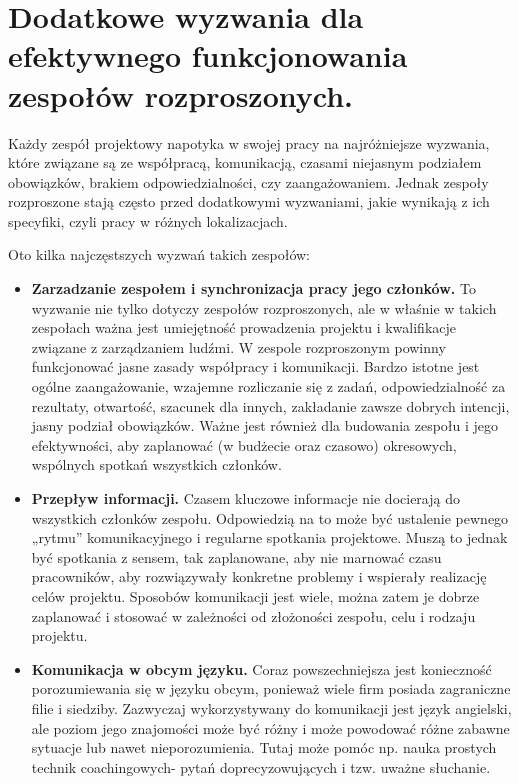 \section{Dodatkowe wyzwania dla efektywnego funkcjonowania zespołów rozproszonych.}

Każdy zespół projektowy napotyka w swojej pracy na najróżniejsze wyzwania, które związane są ze współpracą, komunikacją, czasami niejasnym podziałem obowiązków, brakiem odpowiedzialności, czy zaangażowaniem. Jednak zespoły rozproszone stają często przed dodatkowymi wyzwaniami, jakie wynikają z ich specyfiki, czyli pracy w różnych lokalizacjach.

Oto kilka najczęstszych wyzwań takich zespołów:

\begin{itemize}
	\item \textbf{Zarzadzanie zespołem i synchronizacja pracy jego członków.}
	To wyzwanie nie tylko dotyczy zespołów rozproszonych, ale w właśnie w takich zespołach ważna jest umiejętność prowadzenia projektu i kwalifikacje związane z zarządzaniem ludźmi. W zespole rozproszonym powinny funkcjonować jasne zasady współpracy i komunikacji. Bardzo istotne jest ogólne zaangażowanie, wzajemne rozliczanie się z zadań, odpowiedzialność za rezultaty, otwartość, szacunek dla innych, zakładanie zawsze dobrych intencji, jasny podział obowiązków. Ważne jest również dla budowania zespołu i jego efektywności, aby zaplanować (w budżecie oraz czasowo) okresowych, wspólnych spotkań wszystkich członków.
	\item \textbf{Przepływ informacji.}
	Czasem kluczowe informacje nie docierają do wszystkich członków zespołu. Odpowiedzią na to może być ustalenie pewnego „rytmu” komunikacyjnego i regularne spotkania projektowe. Muszą to jednak być spotkania z sensem, tak zaplanowane, aby nie marnować czasu pracowników, aby rozwiązywały konkretne problemy i wspierały realizację celów projektu. Sposobów komunikacji jest wiele, można zatem je dobrze zaplanować i stosować w zależności od złożoności zespołu, celu i rodzaju projektu.
	\item \textbf{Komunikacja w obcym języku.}
	Coraz powszechniejsza jest konieczność porozumiewania się w języku obcym, ponieważ wiele firm posiada zagraniczne filie i siedziby. Zazwyczaj wykorzystywany do komunikacji jest język angielski, ale poziom jego znajomości może być różny i może powodować różne zabawne sytuacje lub nawet nieporozumienia. Tutaj może pomóc np. nauka prostych technik coachingowych- pytań doprecyzowujących i tzw. uważne słuchanie.
\end{itemize}

